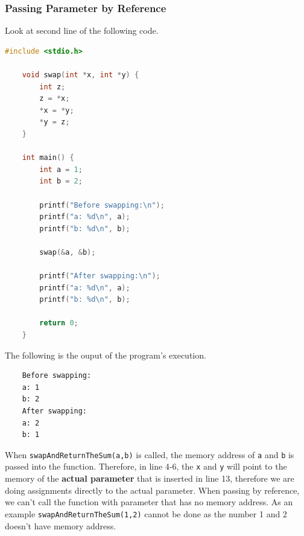 \subsubsection{Passing Parameter by Reference}
Look at second line of the following code.
\begin{lstlisting}[language=c,caption = Passing by Reference,label=lst:passbyreference01]
    #include <stdio.h>

    void swap(int *x, int *y) {
        int z;
        z = *x;
        *x = *y;
        *y = z;
    }
    
    int main() {
        int a = 1;
        int b = 2;
        
        printf("Before swapping:\n");
        printf("a: %d\n", a);
        printf("b: %d\n", b);
        
        swap(&a, &b);
        
        printf("After swapping:\n");
        printf("a: %d\n", a);
        printf("b: %d\n", b);
        
        return 0;
    }
\end{lstlisting}
The following is the ouput of the program's execution.
\begin{verbatim}
    Before swapping:
    a: 1
    b: 2
    After swapping:
    a: 2
    b: 1
\end{verbatim}

When \verb|swapAndReturnTheSum(a,b)| is called,
the memory address of \verb|a| and \verb|b| is passed into
the function. Therefore, in line 4-6, the \verb|x| and
\verb|y| will point to the memory of the \textbf{actual parameter}
that is inserted in line 13, therefore we are doing assignments
directly to the actual parameter. When passing by reference,
we can't call the function with parameter that has no memory
address. As an example \verb|swapAndReturnTheSum(1,2)| cannot be
done as the number 1 and 2 doesn't have memory address.

